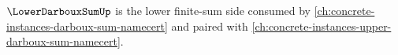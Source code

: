 $\LowerDarbouxSumUp$ is the lower finite-sum side consumed by \autoref{ch:concrete-instances-darboux-sum-namecert} and paired with \autoref{ch:concrete-instances-upper-darboux-sum-namecert}.



